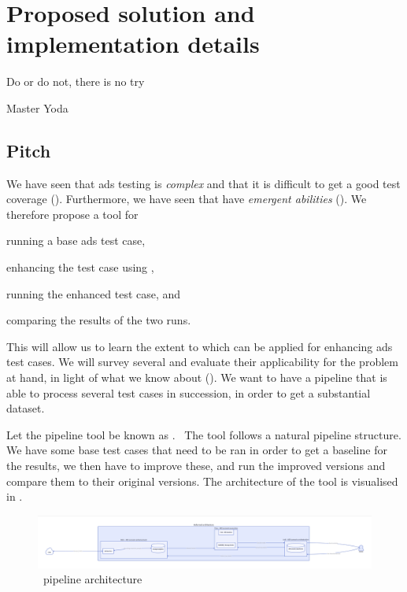 \chapter{Proposed solution and implementation details}\label{sec:solutionProposal}

\epigraph{Do or do not, there is no try}{Master Yoda}

\section*{Pitch}

We have seen that \acrshort{ads} testing is \textit{complex} and that it is difficult to get a good
test coverage (). Furthermore, we have seen that 
have \textit{emergent abilities} (). We therefore propose a tool for
\begin{inparaenum}
    \item running a base \acrshort{ads} test case,
    \item enhancing the test case using ,
    \item running the enhanced test case, and
    \item comparing the results of the two runs.
\end{inparaenum}

This will allow us to learn the extent to which  can be applied for enhancing
\acrlong{ads} test cases. We will survey several  and evaluate their applicability
for the problem at hand, in light of what we know about  (). We
want to have a pipeline that is able to process several test cases in succession, in order to get a
substantial dataset.

Let the pipeline tool be known as \hefe.~%
The tool follows a natural pipeline structure. We have some base test cases that
need to be ran in order to get a baseline for the results, we then have to
improve these, and run the improved versions and compare them to their original
versions. The architecture of the tool is visualised in .

\begin{figure}[h]
    \centering
    \includegraphics[width=\textwidth]{figures/d2-pdf/hefe.pdf}
    \caption{\hefe~pipeline architecture}\label{fig:hefeArch}
\end{figure}


